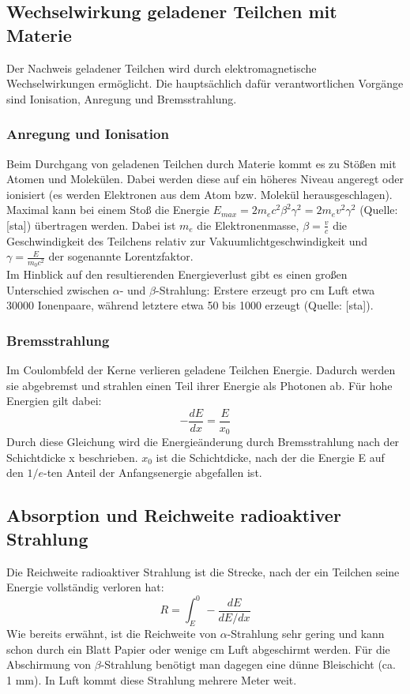 \subsection{Wechselwirkung geladener Teilchen mit Materie}
Der Nachweis geladener Teilchen wird durch elektromagnetische Wechselwirkungen ermöglicht. Die hauptsächlich dafür verantwortlichen Vorgänge sind Ionisation, Anregung und Bremsstrahlung. 
\subsubsection{Anregung und Ionisation}
Beim Durchgang von geladenen Teilchen durch Materie kommt es zu Stößen mit Atomen und Molekülen. Dabei werden diese auf ein höheres Niveau angeregt oder ionisiert (es werden Elektronen aus dem Atom bzw. Molekül herausgeschlagen). Maximal kann bei einem Stoß die Energie $E_{max}=2m_{e}c^{2}\beta^{2}\gamma^{2}=2m_{e}v^{2}\gamma^{2}$ (Quelle:[sta]) übertragen werden. Dabei ist $m_{e}$ die Elektronenmasse, $\beta=\frac{v}{c}$ die Geschwindigkeit des Teilchens relativ zur Vakuumlichtgeschwindigkeit und $\gamma=\frac{E}{m_{0}c^{2}}$ der sogenannte Lorentzfaktor. \\
Im Hinblick auf den resultierenden Energieverlust gibt es einen großen Unterschied zwischen $\alpha$- und $\beta$-Strahlung: Erstere erzeugt pro cm Luft etwa 30000 Ionenpaare, während letztere etwa 50 bis 1000 erzeugt (Quelle: [sta]).
\subsubsection{Bremsstrahlung}
Im Coulombfeld der Kerne verlieren geladene Teilchen Energie. Dadurch werden sie abgebremst und strahlen einen Teil ihrer Energie als Photonen ab. Für hohe Energien gilt dabei: \[-\frac{dE}{dx}=\frac{E}{x_{0}}\] Durch diese Gleichung wird die Energieänderung durch Bremsstrahlung nach der Schichtdicke x beschrieben. $x_{0}$ ist die Schichtdicke, nach der die Energie E auf den $1/e$-ten Anteil der Anfangsenergie abgefallen ist.
\subsection{Absorption und Reichweite radioaktiver Strahlung}
Die Reichweite radioaktiver Strahlung ist die Strecke, nach der ein Teilchen seine Energie vollständig verloren hat: \[R=\int_{E}^{0}-\frac{dE}{dE/dx}\]
Wie bereits erwähnt, ist die Reichweite von $\alpha$-Strahlung sehr gering und kann schon durch ein Blatt Papier oder wenige cm Luft abgeschirmt werden. Für die Abschirmung von $\beta$-Strahlung benötigt man dagegen eine dünne Bleischicht (ca. 1 mm). In Luft kommt diese Strahlung mehrere Meter weit.
